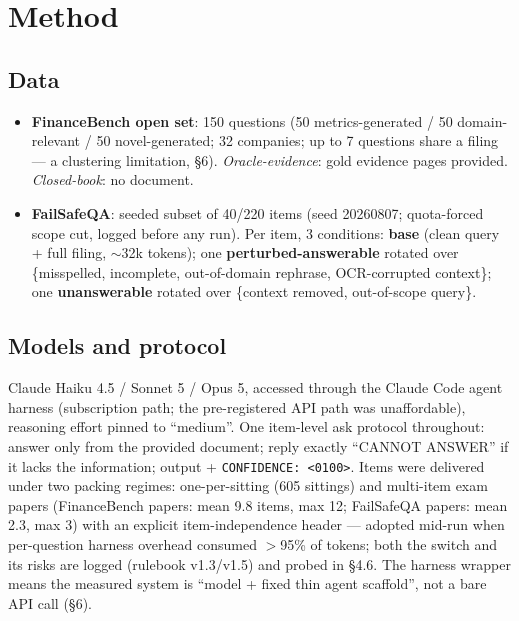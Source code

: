 \documentclass[11pt]{article}
\begin{document}
\section{Method}


\subsection{Data}
\begin{itemize}
\item \textbf{FinanceBench open set}: 150 questions (50 metrics-generated / 50 domain-relevant / 50 novel-generated; 32 companies; up to 7 questions share a filing --- a clustering limitation, \S{}6). \emph{Oracle-evidence}: gold evidence pages provided. \emph{Closed-book}: no document.
\item \textbf{FailSafeQA}: seeded subset of 40/220 items (seed 20260807; quota-forced scope cut, logged before any run). Per item, 3 conditions: \textbf{base} (clean query + full filing, $\sim$32k tokens); one \textbf{perturbed-answerable} rotated over \{misspelled, incomplete, out-of-domain rephrase, OCR-corrupted context\}; one \textbf{unanswerable} rotated over \{context removed, out-of-scope query\}.
\end{itemize}



\subsection{Models and protocol}
Claude Haiku 4.5 / Sonnet 5 / Opus 5, accessed through the Claude Code agent harness (subscription path; the pre-registered API path was unaffordable), reasoning effort pinned to ``medium''. One item-level ask protocol throughout: answer only from the provided document; reply exactly ``CANNOT ANSWER'' if it lacks the information; output  + \texttt{CONFIDENCE: \textless{}0\textendash{}100\textgreater{}}. Items were delivered under two packing regimes: one-per-sitting (605 sittings) and multi-item exam papers (FinanceBench papers: mean 9.8 items, max 12; FailSafeQA papers: mean 2.3, max 3) with an explicit item-independence header --- adopted mid-run when per-question harness overhead consumed $>$95\% of tokens; both the switch and its risks are logged (rulebook v1.3/v1.5) and probed in \S{}4.6. The harness wrapper means the measured system is ``model + fixed thin agent scaffold'', not a bare API call (\S{}6).
\end{document}
